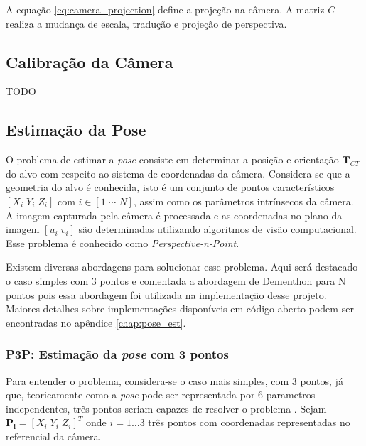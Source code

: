 A equação \eqref{eq:camera_projection} define a projeção na câmera. A matriz $C$ realiza a mudança de escala, tradução e projeção de perspectiva. 

\subsection{Calibração da Câmera}
TODO

\subsection{Estimação da Pose}
O problema de estimar a \textit{pose} consiste em determinar a posição e orientação $\bm{T}_{CT}$ do alvo com respeito ao sistema de coordenadas da câmera. Considera-se que a geometria do alvo é conhecida, isto é um conjunto de pontos característicos $[X_i \; Y_i \; Z_i]$ com $i \in [1\; \cdots \; N]$, assim como os parâmetros intrínsecos da câmera. A imagem capturada pela câmera é processada e as coordenadas no plano da imagem $[u_i\; v_i]$ são determinadas utilizando algoritmos de visão computacional. Esse problema é conhecido como \textit{Perspective-n-Point}.

Existem diversas abordagens para solucionar esse problema. Aqui será destacado o caso simples com 3 pontos e comentada a abordagem de Dementhon para N pontos pois essa abordagem foi utilizada na implementação desse projeto. Maiores detalhes sobre implementações disponíveis em código aberto podem ser encontradas no apêndice \ref{chap:pose_est}. 

\subsubsection{P3P: Estimação da \textit{pose} com 3 pontos}
Para entender o problema, considera-se o caso mais simples, com 3 pontos, já que, teoricamente como a \textit{pose} pode ser representada por 6 parametros independentes, três pontos seriam capazes de resolver o problema \cite{marchand2016pose}. Sejam $\bm{P_i} = [X_i \; Y_i \; Z_i ]^T$ onde $i = 1 \dots 3$ três pontos com coordenadas representadas no referencial da câmera. 

